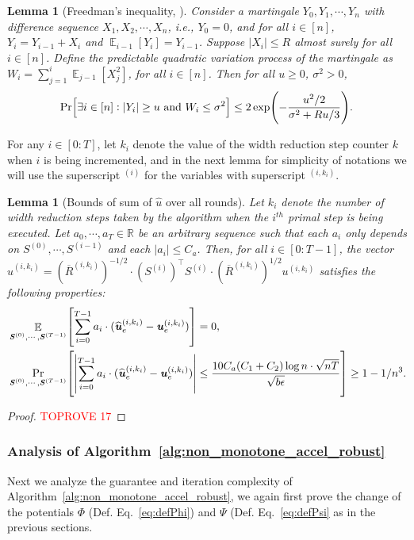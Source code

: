 \documentclass[11pt]{article}
\newtheorem{lemma}[theorem]{Lemma}
\let\originalleft\left
\let\originalright\right
\renewcommand{\left}{\mathopen{}\mathclose\bgroup\originalleft}
\renewcommand{\right}{\aftergroup\egroup\originalright}
\newcommand\uu{\boldsymbol{\mathit{u}}}
\renewcommand\SS{\boldsymbol{\mathit{S}}}
\newcommand\RRbar{\boldsymbol{\overline{\mathit{R}}}}
\newcommand{\wh}{\widehat}
\newcommand\R{\mathbb{R}}
\DeclareMathOperator*{\E}{{\mathbb{E}}}
\begin{document}
\begin{lemma}[Freedman's inequality, \cite{freedman1975tail}]\label{thm:freedman}
Consider a martingale $Y_0, Y_1, \cdots, Y_n$ with difference sequence $X_1, X_2, \cdots, X_n$, i.e., $Y_0 = 0$, and for all $i \in [n]$, $Y_i = Y_{i-1} + X_i$ and $\E_{i-1}[Y_i] = Y_{i-1}$. Suppose $|X_i| \leq R$ almost surely for all $i \in [n]$. Define the predictable quadratic variation process of the martingale as $W_i = \sum_{j=1}^{i} \E_{j-1}[X_j^2]$, for all $i \in [n]$. Then for all $u \geq 0$, $\sigma^2 > 0$,
\[
\Pr\left[ \exists i \in [n]: |Y_i| \geq u \text{ and } W_i \leq \sigma^2 \right] \leq 2 \exp\left(-\frac{u^2/2}{\sigma^2 + R u / 3}\right).
\]
\end{lemma}


For any $i \in [0:T]$, let $k_i$ denote the value of the width reduction step counter $k$ when $i$ is being incremented, and in the next lemma for simplicity of notations we will use the superscript $^{(i)}$ for the variables with superscript $^{(i,k_i)}$.
\begin{lemma}[Bounds of sum of $\wh{\uu}$ over all rounds]\label{lem:sum_hat_u}
Let $k_i$ denote the number of width reduction steps taken by the algorithm when the $i^{th}$ primal step is being executed. Let $a_0, \cdots, a_T \in \R$ be an arbitrary sequence such that each $a_i$ only depends on $\SS^{(0)}, \cdots, \SS^{(i-1)}$ and each $|a_i| \leq C_a$. Then, for all $i \in [0:T-1]$, the vector $\wh{\uu}^{(i,k_i)} = (\RRbar^{(i,k_i)})^{-1/2} \cdot (\SS^{(i)})^{\top} \SS^{(i)} \cdot (\RRbar^{(i,k_i)})^{1/2} \uu^{(i,k_i)}$ satisfies the following properties: 
\begin{align*}
& \E_{\SS^{(0)},\cdots,\SS^{(T-1)}}\left[\sum_{i=0}^{T-1} a_i \cdot (\wh{\uu}^{(i,k_i)}_e - \uu^{(i,k_i)}_e)\right] = 0, \\
& \Pr_{\SS^{(0)},\cdots,\SS^{(T-1)}}\left[ \left|\sum_{i=0}^{T-1} a_i \cdot (\wh{\uu}^{(i,k_i)}_e - \uu^{(i,k_i)}_e)\right| \leq \frac{10 C_a (C_1 + C_2) \log n \cdot \sqrt{nT}}{\sqrt{b \epsilon}} \right] \geq 1 - 1/n^3.
\end{align*}
\end{lemma}
\begin{proof}\textcolor{red}{TOPROVE 17}\end{proof}



\subsubsection{Analysis of Algorithm~\ref{alg:non_monotone_accel_robust}}
Next we analyze the guarantee and iteration complexity of Algorithm~\ref{alg:non_monotone_accel_robust}, we again first prove the change of the potentials $\Phi$ (Def. Eq.~\eqref{eq:defPhi}) and $\Psi$ (Def. Eq.~\eqref{eq:defPsi} as in the previous sections. 
\end{document}
